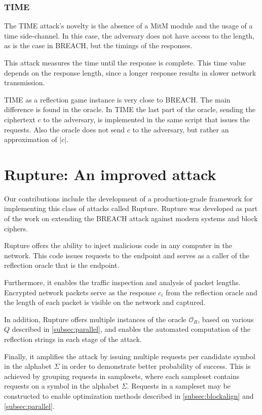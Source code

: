 \documentclass[conference, letterpaper, 10pt]{IEEEtran}
\begin{document}
\subsubsection{TIME}
The TIME attack's novelty is the absence of a MitM module and the usage of a
time side-channel. In this case, the adversary does not have access to the
length, as is the case in BREACH, but the timings of the responses.

This attack measures the time until the response is complete. This time value
depends on the response length, since a longer response results in slower
network transmission.

TIME as a reflection game instance is very close to BREACH. The main difference
is found in the oracle. In TIME the last part of the oracle, sending the
ciphertext $c$ to the adversary, is implemented in the same script that issues the
requests. Also the oracle does not send $c$ to the adversary, but
rather an approximation of $\rvert c \rvert$.

\section{Rupture: An improved attack}\label{subsec:rupture}
Our contributions include the development of a production-grade
framework for implementing this class of attacks called Rupture.
Rupture was developed as part of the work on extending the BREACH attack against
modern systems and block ciphers.

Rupture offers the ability to inject malicious code in any computer in the
network. This code issues requests to the endpoint and serves as a caller of
the reflection oracle that is the endpoint.

Furthermore, it enables the traffic inspection and analysis of packet
lengths. Encrypted network packets serve as the response $c_i$ from the
reflection oracle and the length of each packet is visible on the network and
captured.

In addition, Rupture offers multiple instances of the oracle $\mathcal{O}_R$, based
on various $Q$ described in \ref{subsec:parallel}, and enables the automated
computation of the reflection strings in each stage of the attack.

Finally, it amplifies the attack by issuing multiple requests per candidate
symbol in the alphabet $\Sigma$ in order to demonstrate better probability of
success. This is achieved by grouping requests in samplesets, where each
sampleset contains requests on a symbol in the alphabet $\Sigma$. Requests in a
sampleset may be constructed to enable optimization methods described in
\ref{subsec:blockalign} and \ref{subsec:parallel}.
\end{document}
